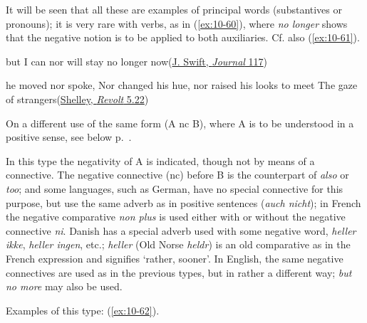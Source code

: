 It will be seen that all these are examples of principal words (substantives or pronouns); it is very rare with verbs, as in (\ref{ex:10-60}), where \textit{no longer} shows that the negative notion is to be applied to both auxiliaries. Cf. also (\ref{ex:10-61}).

\ea \label{ex:10-60} but I can nor will stay no longer now\hfill(\href{https://archive.org/details/journaltostellae00swifuoft/page/116/mode/2up?q=%22can+nor+will+stay%22&view=theater}{J. Swift, \textit{Journal} 117})
\z

\ea \label{ex:10-61} he moved nor spoke, Nor changed his hue, nor raised his looks to meet The gaze of strangers\hfill(\href{https://archive.org/details/completepoeticalshel/page/82/mode/2up?view=theater&q=%22he+moved+nor+spoke%22}{Shelley, \textit{Revolt} 5.22}) %
\z

On a different use of the same form (A nc B), where A is to be understood in a positive sense, see below p.~\pageref{another-way-of-using-it}.

 \label{sec:10.5}
In this type the negativity of A is indicated, though not by means of a connective. The negative connective (nc) before B is the counterpart of \textit{also} or \textit{too}; and some languages, such as German, have no special connective for this purpose, but use the same adverb as in positive sentences (\textit{auch nicht}); in French the negative comparative 
\textit{non plus} is used either with or without the negative connective \textit{ni}. Danish has a special adverb used with some negative word, \textit{heller ikke}, \textit{heller ingen}, etc.; \textit{heller} (Old Norse \textit{heldr}) is an old comparative as in the French expression and signifies `rather, sooner'. In English, the same negative connectives are used as in the previous types, but in rather a different way; \textit{but no more} may also be used.\label{para:143}

Examples of this type: (\ref{ex:10-62}).

